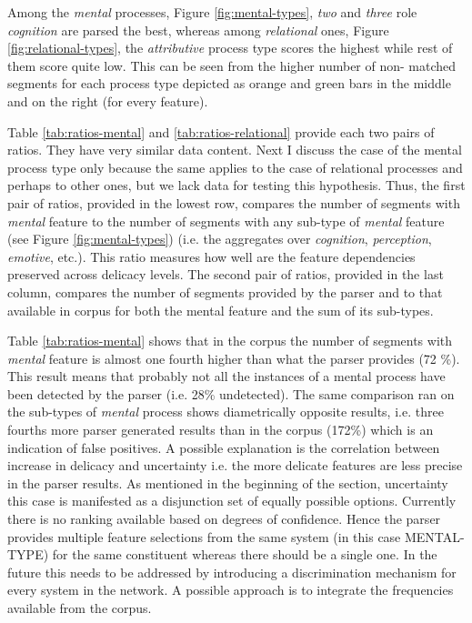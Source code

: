     Among the \textit{mental} processes, Figure \ref{fig:mental-types}, \textit{two} and \textit{three} role \textit{cognition} are parsed the best, whereas among \textit{relational} ones, Figure \ref{fig:relational-types}, the \textit{attributive} process type scores the highest while rest of them score quite low. This can be seen from the higher number of  non- matched segments for each process type depicted as orange and green bars in the middle and on the right (for every feature). 

    Table \ref{tab:ratios-mental} and \ref{tab:ratios-relational} provide each two pairs of ratios. They have very similar data content. Next I discuss the case of the mental process type only because the same applies to the case of relational processes and perhaps to other ones, but we lack data for testing this hypothesis. Thus, the first pair of ratios, provided in the lowest row, compares the number of segments with \textit{mental} feature to the number of segments with any sub-type of \textit{mental} feature (see Figure \ref{fig:mental-types}) (i.e. the aggregates over \textit{cognition}, \textit{perception}, \textit{emotive}, etc.). This ratio measures how well are the feature dependencies preserved across delicacy levels. The second pair of ratios, provided in the last column, compares the number of segments provided by the parser and to that available in corpus for both the mental feature and the sum of its sub-types. 

    Table \ref{tab:ratios-mental} shows that in the corpus the number of segments with \textit{mental} feature is almost one fourth higher than what the parser provides (72 \%). This result means that probably not all the instances of a mental process have been detected by the parser (i.e. 28\% undetected). The same comparison ran on the sub-types of \textit{mental} process shows diametrically opposite results, i.e. three fourths more parser generated results than in the corpus (172\%) which is an indication of false positives. A possible explanation is the correlation between increase in delicacy and uncertainty i.e. the more delicate features are less precise in the parser results. As mentioned in the beginning of the section, uncertainty this case is manifested as a disjunction set of equally possible options. Currently there is no ranking available based on degrees of confidence. Hence the parser provides multiple feature selections from the same system (in this case MENTAL-TYPE) for the same constituent whereas there should be a single one. In the future this needs to be addressed by introducing a discrimination mechanism for every system in the network. A possible approach is to integrate the frequencies available from the corpus.

